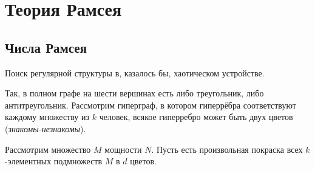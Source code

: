 \documentclass[a4paper]{report}
\begin{document}
    \section{Теория Рамсея}

    \subsection{Числа Рамсея}
    Поиск регулярной структуры в, казалось бы, хаотическом устройстве.

    Так, в полном графе на шести вершинах есть либо треугольник, либо антитреугольник.
    \ok
    Рассмотрим гиперграф, в котором гиперрёбра соответствуют каждому множеству из $k$ человек, всякое гиперребро может быть двух цветов (\textit{знакомы-незнакомы}).

    Рассмотрим множество $M$ мощности $N$.
    Пусть есть произвольная покраска всех $k$-элементных подмножеств $M$ в $d$ цветов.
\end{document}
